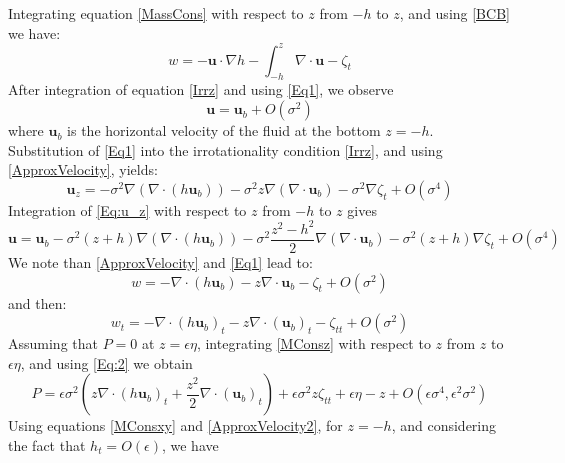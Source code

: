 \documentclass[11pt,a4paper]{article}
\begin{document}
			Integrating equation \eqref{MassCons} with respect to $z$ from $-h$ to $z$, and using \eqref{BCB} we have: 
			\begin{equation}
				w = -\mathbf{u} \cdot \nabla h - \int^z_{-h} \nabla \cdot \mathbf{u} - \zeta_t 
				\label{Eq1}
			\end{equation}
			After integration of equation \eqref{Irrz} and using \eqref{Eq1}, we observe 
			\begin{equation}
				\mathbf{u} = \mathbf{u}_b + O(\sigma^2) \label{ApproxVelocity}
			\end{equation}
			where $\mathbf{u}_b$ is the horizontal velocity of the fluid at the bottom $z=-h$. Substitution of \eqref{Eq1} into the irrotationality condition \eqref{Irrz}, and using \eqref{ApproxVelocity}, yields:
			\begin{equation}
				\mathbf{u}_z = -\sigma^2\nabla(\nabla \cdot (h \mathbf{u}_b)) - \sigma^2 z \nabla(\nabla \cdot \mathbf{u}_b) - \sigma^2 \nabla \zeta_t + O(\sigma^4) 
				\label{Eq:u_z}
			\end{equation}
			Integration of \eqref{Eq:u_z} with respect to $z$ from $-h$ to $z$ gives
			\begin{equation}
				\mathbf{u} = \mathbf{u}_b - \sigma^2(z+h)\nabla (\nabla \cdot (h \mathbf{u}_b)) - \sigma^2 \frac{z^2-h^2}{2}\nabla ( \nabla \cdot \mathbf{u}_b) - \sigma^2(z+h)\nabla \zeta_t + O(\sigma^4) \label{ApproxVelocity2}
			\end{equation}
			We note than \eqref{ApproxVelocity} and \eqref{Eq1} lead to: 
			\begin{equation}
				w = - \nabla \cdot (h \mathbf{u}_b) - z \nabla \cdot \mathbf{u}_b - \zeta_t + O(\sigma^2)
			\end{equation}
			and then:
			\begin{equation}
				w_t = - \nabla \cdot (h \mathbf{u}_b)_t - z \nabla \cdot (\mathbf{u}_b)_t - \zeta_{tt} + O(\sigma^2) \label{Eq:2} 
			\end{equation}
			Assuming that $P = 0$ at $z = \epsilon\eta$, integrating \eqref{MConsz} with respect to $z$ from $z$ to $\epsilon\eta$, and using \eqref{Eq:2} we obtain
			\begin{equation}
				P = \epsilon \sigma^2(z\nabla \cdot (h \mathbf{u}_b)_t + \frac{z^2}{2} \nabla \cdot (\mathbf{u}_b)_t) + \epsilon \sigma^2z \zeta_{tt} + \epsilon \eta - z + O(\epsilon\sigma^4, \epsilon^2 \sigma^2)
			\end{equation}
			Using equations \eqref{MConsxy} and \eqref{ApproxVelocity2}, for $z = -h$, and considering the fact that $h_t = O(\epsilon)$, we have
\end{document}
